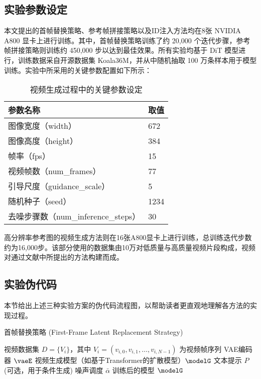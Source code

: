 \cleardoublepage

{
    \appendixsubsecmajornumbering
    \subsection{实验参数设定}
    本文提出的首帧替换策略、参考帧拼接策略以及ID注入方法均在8张 NVIDIA A800 显卡上进行训练。其中，首帧替换策略训练了约 20,000 个迭代步骤，参考帧拼接策略则训练约 450,000 步以达到最佳效果。所有实验均基于 DiT 模型进行，训练数据采自开源数据集 Koala36M，并从中随机抽取 100 万条样本用于模型训练。实验中所采用的关键参数配置如下所示：

\begin{table}[h]
\centering
\caption{视频生成过程中的关键参数设定}
\begin{tabular}{ll}
\toprule
\textbf{参数名称} & \textbf{取值} \\
\midrule
图像宽度（width） & 672 \\
图像高度（height） & 384 \\
帧率（fps） & 15 \\
视频帧数（num\_frames） & 77 \\
引导尺度（guidance\_scale） & 5 \\
随机种子（seed） & 1234 \\
去噪步骤数（num\_inference\_steps） & 30 \\
\bottomrule
\end{tabular}
\label{tab:video-gen-params}
\end{table}
    高分辨率参考图的视频生成方法则在16张A800显卡上进行训练，总训练迭代步数约为16,000步。该部分使用的数据集由10万对低质量与高质量视频片段构成，视频对通过文献\cite{wang2021real}中所提出的方法构建而成。

    \subsection{实验伪代码}

    本节给出上述三种实验方案的伪代码流程图，以帮助读者更直观地理解各方法的实现过程。


{\small
\begin{algorithm}
    \setlength{\baselineskip}{0.9\baselineskip}
    \caption{首帧替换策略 (First-Frame Latent Replacement Strategy)}
    \label{alg:first_frame_replacement}
    \begin{algorithmic}[1]
    \Require 
        \Statex 视频数据集 $D = \{V_i\}$，其中 $V_i = (v_{i,0}, v_{i,1}, \dots, v_{i,N-1})$ 为视频帧序列
        \Statex VAE编码器 $\vaeE$
        \Statex 视频生成模型（如基于Transformer的扩散模型）$\modelG$
        \Statex 文本提示 $P$ (可选，用于条件生成)
        \Statex 噪声调度 $\bar{\alpha}$
    \Ensure 训练后的模型 $\modelG$
    

\end{algorithmic}
\end{algorithm}}}
